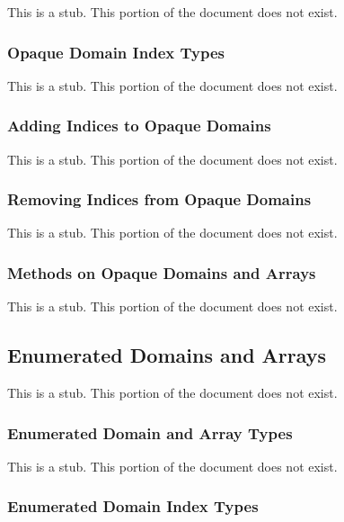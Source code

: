 This is a stub.  This portion of the document does not exist.

\subsubsection{Opaque Domain Index Types}
\label{Opaque_Domain_Index_Types}

This is a stub.  This portion of the document does not exist.

\subsubsection{Adding Indices to Opaque Domains}
\label{Adding_Indices_to_Opaque_Domains}

This is a stub.  This portion of the document does not exist.

\subsubsection{Removing Indices from Opaque Domains}
\label{Removing_Indices_from_Opaque_Domains}

This is a stub.  This portion of the document does not exist.

\subsubsection{Methods on Opaque Domains and Arrays}
\label{Methods_on_Opaque_Domains_and_Arrays}

This is a stub.  This portion of the document does not exist.

\subsection{Enumerated Domains and Arrays}
\label{Enumerated_Domains_and_Arrays}

This is a stub.  This portion of the document does not exist.

\subsubsection{Enumerated Domain and Array Types}
\label{Enumerated_Domain_and_Array_Types}

This is a stub.  This portion of the document does not exist.

\subsubsection{Enumerated Domain Index Types}
\label{Enumerated_Domain_Index_Types}

